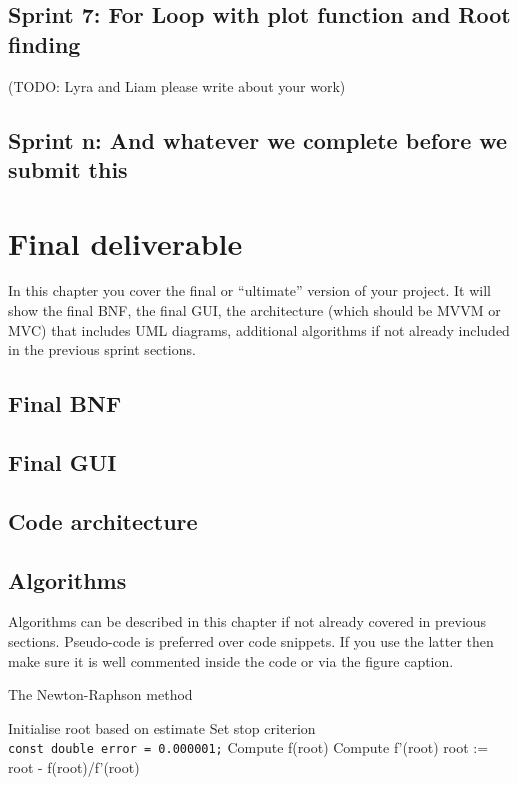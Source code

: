 \documentclass[a4paper, oneside, 11pt]{report}
\begin{document}
\section{Sprint 7: For Loop with plot function and Root finding}
(TODO: Lyra and Liam please write about your work)

\section{Sprint n: And whatever we complete before we submit this}



\chapter{Final deliverable}\label{Impl}

In this chapter you cover the final or ``ultimate'' version of your project. It will show the final BNF, the final GUI, the architecture (which should be MVVM or MVC) that includes UML diagrams, additional algorithms if not already included in the previous sprint sections.

\section{Final BNF}

\section{Final GUI}

\section{Code architecture}
\label{code-arch}

\section{Algorithms}

Algorithms can be described in this chapter if not already covered in previous sections. Pseudo-code is preferred over code snippets. If you use the latter then make sure it is well commented inside the code or via the figure caption. 

\begin{algorithm}[th]
\caption{ The Newton-Raphson method }
\begin{algorithmic}[1]
\STATE Initialise root based on estimate
\STATE Set stop criterion
\\ \texttt{const double error = 0.000001;}
	\STATE Compute f(root)
	\STATE Compute f'(root)
	\STATE root := root - f(root)/f'(root)
\ENDWHILE
\end{algorithmic}
\end{algorithm}
\end{document}
